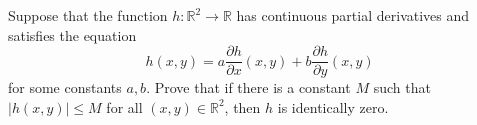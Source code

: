  Suppose that the function $h:\mathbb{R}^2\to \mathbb{R}$ has continuous partial
derivatives and satisfies the equation
\[
h(x,y) = a \frac{\partial h}{\partial x}(x,y) +
b \frac{\partial h}{\partial y}(x,y)
\]
for some constants $a,b$. Prove that if there is a constant $M$ such that
$|h(x,y)|\leq M$ for all $(x,y) \in \mathbb{R}^2$, then $h$ is identically zero.

